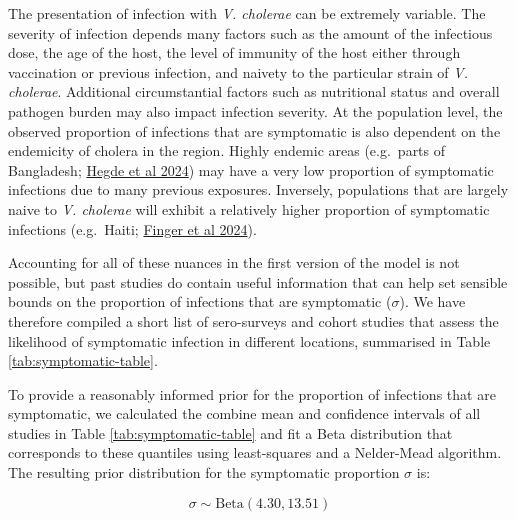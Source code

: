 \documentclass[
]{book}
\begin{document}
The presentation of infection with \emph{V. cholerae} can be extremely variable. The severity of infection depends many factors such as the amount of the infectious dose, the age of the host, the level of immunity of the host either through vaccination or previous infection, and naivety to the particular strain of \emph{V. cholerae}. Additional circumstantial factors such as nutritional status and overall pathogen burden may also impact infection severity. At the population level, the observed proportion of infections that are symptomatic is also dependent on the endemicity of cholera in the region. Highly endemic areas (e.g.~parts of Bangladesh; \href{https://www.nature.com/articles/s41591-024-02810-4}{Hegde et al 2024}) may have a very low proportion of symptomatic infections due to many previous exposures. Inversely, populations that are largely naive to \emph{V. cholerae} will exhibit a relatively higher proportion of symptomatic infections (e.g.~Haiti; \href{https://www.ncbi.nlm.nih.gov/pmc/articles/PMC10635253/}{Finger et al 2024}).

Accounting for all of these nuances in the first version of the model is not possible, but past studies do contain useful information that can help set sensible bounds on the proportion of infections that are symptomatic (\(\sigma\)). We have therefore compiled a short list of sero-surveys and cohort studies that assess the likelihood of symptomatic infection in different locations, summarised in Table \ref{tab:symptomatic-table}.

To provide a reasonably informed prior for the proportion of infections that are symptomatic, we calculated the combine mean and confidence intervals of all studies in Table \ref{tab:symptomatic-table} and fit a Beta distribution that corresponds to these quantiles using least-squares and a Nelder-Mead algorithm. The resulting prior distribution for the symptomatic proportion \(\sigma\) is:

\begin{equation}
\sigma \sim \text{Beta}(4.30, 13.51)
\end{equation}
\end{document}
